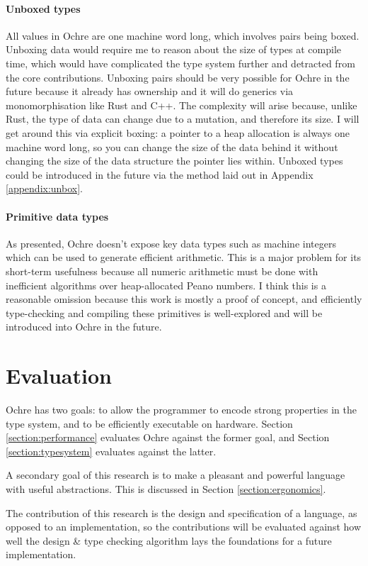 \documentclass[12pt,twoside]{report}
\begin{document}
\subsubsection{Unboxed types}
All values in Ochre are one machine word long, which involves pairs being boxed. Unboxing data would require me to reason about the size of types at compile time, which would have complicated the type system further and detracted from the core contributions. Unboxing pairs should be very possible for Ochre in the future because it already has ownership and it will do generics via monomorphisation like Rust and C++. The complexity will arise because, unlike Rust, the type of data can change due to a mutation, and therefore its size. I will get around this via explicit boxing: a pointer to a heap allocation is always one machine word long, so you can change the size of the data behind it without changing the size of the data structure the pointer lies within. Unboxed types could be introduced in the future via the method laid out in Appendix \ref{appendix:unbox}.

\subsubsection{Primitive data types}
As presented, Ochre doesn't expose key data types such as machine integers which can be used to generate efficient arithmetic. This is a major problem for its short-term usefulness because all numeric arithmetic must be done with inefficient algorithms over heap-allocated Peano numbers. I think this is a reasonable omission because this work is mostly a proof of concept, and efficiently type-checking and compiling these primitives is well-explored and will be introduced into Ochre in the future.

\chapter{Evaluation}
Ochre has two goals: to allow the programmer to encode strong properties in the type system, and to be efficiently executable on hardware. Section \ref{section:performance} evaluates Ochre against the former goal, and Section \ref{section:typesystem} evaluates against the latter.

A secondary goal of this research is to make a pleasant and powerful language with useful abstractions. This is discussed in Section \ref{section:ergonomics}.

The contribution of this research is the design and specification of a language, as opposed to an implementation, so the contributions will be evaluated against how well the design \& type checking algorithm lays the foundations for a future implementation.
\end{document}
